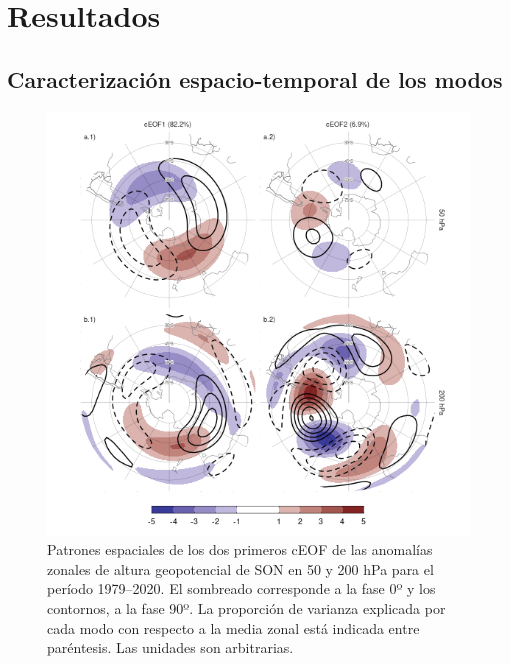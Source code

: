 \documentclass[12pt,oneside]{reedthesis}
\begin{document}
\hypertarget{resultados-1}{%
\section{Resultados}\label{resultados-1}}

\hypertarget{caracterizaciuxf3n-espacio-temporal-de-los-modos}{%
\subsection{Caracterización espacio-temporal de los modos}\label{caracterizaciuxf3n-espacio-temporal-de-los-modos}}



\begin{figure}
\includegraphics{figures/20-ceofs/ceofs-1-1} \caption{Patrones espaciales de los dos primeros cEOF de las anomalías zonales de altura geopotencial de SON en 50 y 200 hPa para el período 1979--2020. El sombreado corresponde a la fase 0º y los contornos, a la fase 90º. La proporción de varianza explicada por cada modo con respecto a la media zonal está indicada entre paréntesis. Las unidades son arbitrarias.}\label{fig:ceofs-1}
\end{figure}
\end{document}
